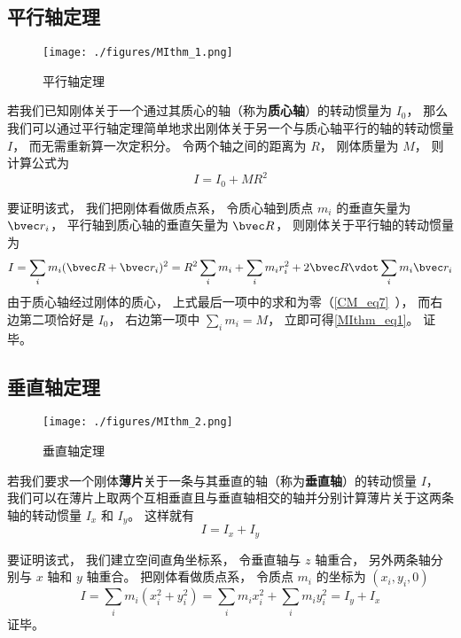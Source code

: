 

\subsection{平行轴定理}
\begin{figure}[ht]
\centering
\texttt{[image: ./figures/MIthm\_1.png]}
\caption{平行轴定理} \label{MIthm_fig1}
\end{figure}

若我们已知刚体关于一个通过其质心的轴（称为\textbf{质心轴}）的转动惯量为 $I_0$， 那么我们可以通过平行轴定理简单地求出刚体关于另一个与质心轴平行的轴的转动惯量 $I$， 而无需重新算一次定积分。 令两个轴之间的距离为 $R$， 刚体质量为 $M$， 则计算公式为%
\begin{equation}\label{MIthm_eq1}
I = I_0 + MR^2
\end{equation}

要证明该式， 我们把刚体看做质点系， 令质心轴到质点 $m_i$ 的垂直矢量为 $\bvec r_i$， 平行轴到质心轴的垂直矢量为 $\bvec R$， 则刚体关于平行轴的转动惯量为
\begin{equation}
I = \sum_i m_i (\bvec R + \bvec r_i)^2 = R^2\sum_i m_i + \sum_i m_i r_i^2 + 2\bvec R \vdot \sum_i m_i \bvec r_i
\end{equation}
由于质心轴经过刚体的质心， 上式最后一项中的求和为零（\autoref{CM_eq7}~）， 而右边第二项恰好是 $I_0$， 右边第一项中 $\sum_i m_i = M$， 立即可得\autoref{MIthm_eq1}。 证毕。


\subsection{垂直轴定理}
\begin{figure}[ht]
\centering
\texttt{[image: ./figures/MIthm\_2.png]}
\caption{垂直轴定理} \label{MIthm_fig2}
\end{figure}
若我们要求一个刚体\textbf{薄片}关于一条与其垂直的轴（称为\textbf{垂直轴}）的转动惯量 $I$， 我们可以在薄片上取两个互相垂直且与垂直轴相交的轴并分别计算薄片关于这两条轴的转动惯量 $I_x$ 和 $I_y$。 这样就有
\begin{equation}\label{MIthm_eq2}
I = I_x + I_y
\end{equation}

要证明该式， 我们建立空间直角坐标系， 令垂直轴与 $z$ 轴重合， 另外两条轴分别与 $x$ 轴和 $y$ 轴重合。 把刚体看做质点系， 令质点 $m_i$ 的坐标为 $(x_i, y_i, 0)$
\begin{equation}
I = \sum_i m_i (x_i^2 + y_i^2) = \sum_i m_i x_i^2 + \sum_i m_i y_i^2 = I_y + I_x
\end{equation}
证毕。

